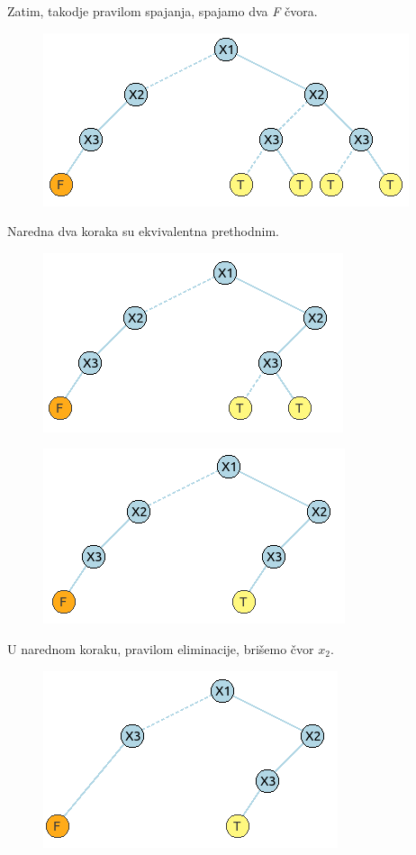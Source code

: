 \begin{exmp}
    Zatim, takodje pravilom spajanja, spajamo dva \emph{F} \v{c}vora.

    \begin{figure}[H]
        \centering
        \includegraphics{slike/primer/02.png}
    \end{figure}

    Naredna dva koraka su ekvivalentna prethodnim.

    \begin{figure}[H]
        \centering
        \includegraphics{slike/primer/03.png}
    \end{figure}

    \begin{figure}[H]
        \centering
        \includegraphics{slike/primer/04.png}
    \end{figure}

    U narednom koraku, pravilom eliminacije, bri\v{s}emo \v{c}vor $x_{2}$.

    \begin{figure}[H]
        \centering
        \includegraphics{slike/primer/05.png}
    \end{figure}


\end{exmp}

